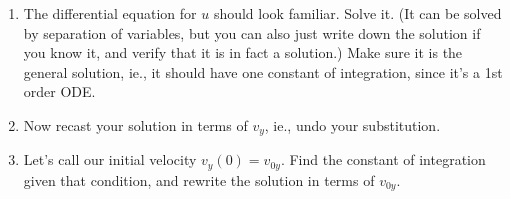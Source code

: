 \documentclass[12pt]{article}
\begin{document}
\begin{enumerate}
\begin{enumerate}[resume]

          \item The differential equation for $u$ should look familiar. Solve it. (It can be solved by separation of variables, but you can also just write down the solution if you know it, and verify that it is in fact a solution.) Make sure it is the general solution, ie., it should have one constant of integration, since it's a 1st order ODE.

          \item Now recast your solution in terms of $v_y$, ie., undo your substitution.



          \item Let's call our initial velocity $v_y(0) = v_{0y}$. Find the constant of integration given that condition, and rewrite the solution in terms of $v_{0y}$.


\end{enumerate}
\end{enumerate}
\end{document}
